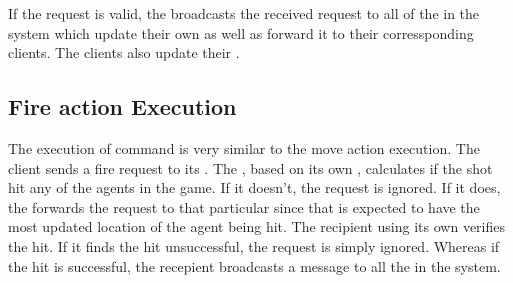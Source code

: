 	If the request is valid, the \localServer broadcasts the received request to all of the \localServers in the system which update their own \gamestate as well as forward it to their corressponding clients. The clients also update their \gamestates.

\subsection{Fire action Execution}
	The execution of \fire{\position}{\direction} command is very similar to the move action execution. The client sends a fire request to its \localServer. The \localServer, based on its own \gamestate, calculates if the shot hit any of the agents in the game. If it doesn't, the request is ignored. If it does, the \localServer forwards the request to that particular \localServer since that \localServer is expected to have the most updated location of the agent being hit. The recipient \localServer using its own \gamestate verifies the hit. If it finds the hit unsuccessful, the request is simply ignored. Whereas if the hit is successful, the recepient \localServer broadcasts a  message to all the \localServers in the system.
